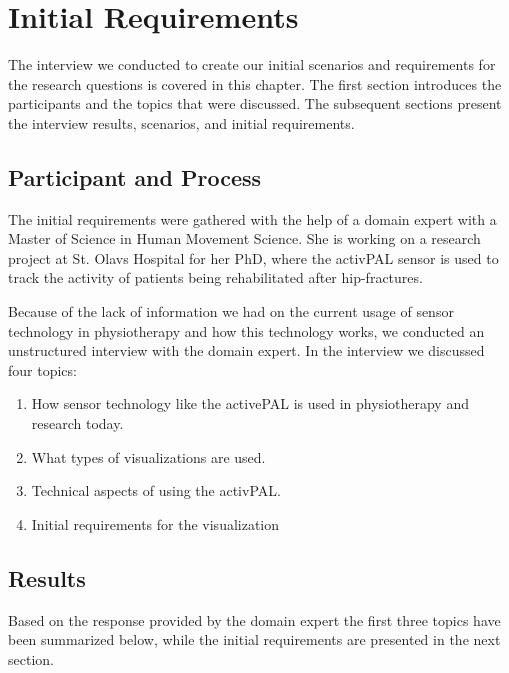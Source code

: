 \chapter{Initial Requirements}
\label{ch:initialRequirements}
The interview we conducted to create our initial scenarios and requirements for the research questions is covered in this chapter. The first section introduces the participants and the topics that were discussed. The subsequent sections present the interview results, scenarios, and initial requirements.

\section{Participant and Process}
\label{sec:reqGathering}
The initial requirements were gathered with the help of a domain expert with a Master of Science in Human Movement Science. She is working on a research project at St. Olavs Hospital for her PhD, where the activPAL sensor is used to track the activity of patients being rehabilitated after hip-fractures.

Because of the lack of information we had on the current usage of sensor technology in physiotherapy and how this technology works, we conducted an unstructured interview with the domain expert. In the interview we discussed four topics: 

\begin{enumerate}
  \item How sensor technology like the activePAL is used in physiotherapy and research today.
  \item What types of visualizations are used.
  \item Technical aspects of using the activPAL.
  \item Initial requirements for the visualization
\end{enumerate}

\section{Results}
Based on the response provided by the domain expert the first three topics have been summarized below, while the initial requirements are presented in the next section.

